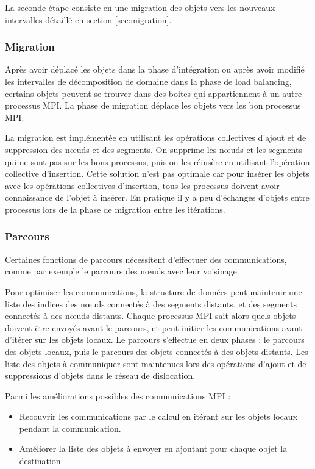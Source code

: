 La seconde étape consiste en une migration des objets vers les nouveaux intervalles détaillé en section \ref{sec:migration}.

\subsubsection{Migration}

Après avoir déplacé les objets dans la phase d'intégration ou après avoir modifié les intervalles de décomposition de domaine dans la phase de load balancing, certains objets peuvent se trouver dans des boites qui appartiennent à un autre processus MPI. La phase de migration déplace les objets vers les bon processus MPI. 

La migration est implémentée en utilisant les opérations collectives d'ajout et de suppression des nœuds et des segments. On supprime les nœuds et les segments qui ne sont pas sur les bons processus, puis on les réinsère en utilisant l'opération collective d'insertion. Cette solution n'est pas optimale car pour insérer les objets avec les opérations collectives d'insertion, tous les processus doivent avoir connaissance de l'objet à insérer. En pratique il y a peu d'échanges d'objets entre processus lors de la phase de migration entre les itérations.

\subsubsection{Parcours}

Certaines fonctions de parcours nécessitent d'effectuer des communications, comme par exemple le parcours des nœuds avec leur voisinage.

Pour optimiser les communications, la structure de données peut maintenir une liste des indices des nœuds connectés à des segments distants, et des segments connectés à des nœuds distants. Chaque processus MPI sait alors quels objets doivent être envoyés avant le parcours, et peut initier les communications avant d'itérer sur les objets locaux. Le parcours s'effectue en deux phases : le parcours des objets locaux, puis le parcours des objets connectés à des objets distants. Les liste des objets à communiquer sont maintenues lors des opérations d'ajout et de suppressions d'objets dans le réseau de dislocation.

Parmi les améliorations possibles des communications MPI :
\begin{itemize}
\item Recouvrir les communications par le calcul en itérant sur les objets locaux pendant la communication.
\item Améliorer la liste des objets à envoyer en ajoutant pour chaque objet la destination.
\end{itemize}

